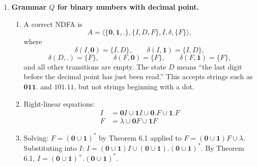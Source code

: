 \begin{enumerate}[{8.}1. ]
\begin{enumerate}
\item The left-linear analogue of Lemma~8.4 is: if
\[
X=E\cup XA,
\]
then $EA^*$ is always a solution, and any other solution $Y$ must satisfy
$EA^*\subseteq Y$.

The left-linear analogue of Lemma~8.5 is obtained by eliminating the last
unknown on the right.  If
\[
X_n=E_n\cup X_1A_{1n}\cup\cdots\cup X_{n-1}A_{(n-1)n}\cup X_nA_{nn},
\]
then the compatible minimal choice for $X_n$ is
\[
X_n=(E_n\cup X_1A_{1n}\cup\cdots\cup X_{n-1}A_{(n-1)n})A_{nn}^*.
\]
Substituting this into the first $n-1$ equations yields
\[
\hat{E}_i=E_i\cup E_nA_{nn}^*A_{ni},
\qquad
\hat{A}_{ji}=A_{ji}\cup A_{jn}A_{nn}^*A_{ni},
\]
for $i,j=1,2,\ldots,n-1$.

\item For $G_2$ in Example~8.12, the language equations are
\[
X_S=X_A\pmb{baa},\qquad X_A=\lambda\cup X_A\pmb{a}.
\]
By the left-linear version of Theorem 6.1,
\[
X_A=\lambda\pmb{a}^*=\pmb{a}^*.
\]
Therefore
\[
L(G_2)=X_S=X_A\pmb{baa}=\pmb{a}^*\pmb{baa}.
\]
\end{enumerate}

\item \textbf{Grammar $Q$ for binary numbers with decimal point.}

\begin{enumerate}
\item A correct NDFA is
\[
A=\langle\{\pmb{0},\pmb{1},\pmb{.}\},\{I,D,F\},I,\delta,\{F\}\rangle,
\]
where
\[
\delta(I,\pmb{0})=\{I,D\},\qquad \delta(I,\pmb{1})=\{I,D\},
\]
\[
\delta(D,\pmb{.})=\{F\},\qquad
\delta(F,\pmb{0})=\{F\},\qquad \delta(F,\pmb{1})=\{F\},
\]
and all other transitions are empty.  The state $D$ means ``the last digit
before the decimal point has just been read.''  This accepts strings such as
$\pmb{011.}$ and $\pmb{101.11}$, but not strings beginning with a dot.

\item Right-linear equations:
\begin{align*}
I &= \pmb{0}I \cup \pmb{1}I \cup \pmb{0}\pmb{.}F \cup \pmb{1}\pmb{.}F \\
F &= \lambda \cup \pmb{0}F \cup \pmb{1}F
\end{align*}

\item Solving: $F = (\pmb{0}\cup\pmb{1})^*$ by Theorem 6.1 applied to $F = (\pmb{0}\cup\pmb{1})F\cup\lambda$.
Substituting into $I$: $I = (\pmb{0}\cup\pmb{1})I \cup (\pmb{0}\cup\pmb{1})\pmb{.}(\pmb{0}\cup\pmb{1})^*$.
By Theorem 6.1, $I = (\pmb{0}\cup\pmb{1})^+\pmb{.}(\pmb{0}\cup\pmb{1})^*$.
\end{enumerate}


\end{enumerate}
